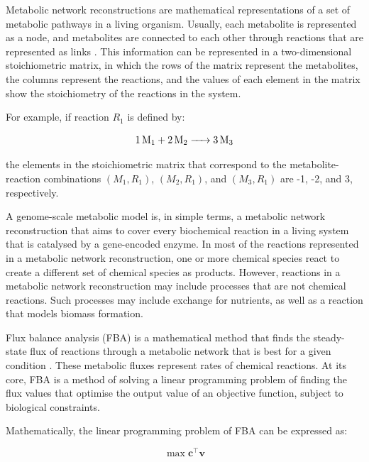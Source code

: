 Metabolic network reconstructions are mathematical representations of a set of metabolic pathways in a living organism.
Usually, each metabolite is represented as a node, and metabolites are connected to each other through reactions that are represented as links \parencite{palssonSystemsBiologyConstraintbased2015}.
This information can be represented in a two-dimensional stoichiometric matrix, in which the rows of the matrix represent the metabolites, the columns represent the reactions, and the values of each element in the matrix show the stoichiometry of the reactions in the system.

For example, if reaction $R_{1}$ is defined by:

\begin{equation}
  \ce{1 M1 + 2 M2 -> 3 M3}
  \label{eq:model-example-chemical-reaction}
\end{equation}

the elements in the stoichiometric matrix that correspond to the metabolite-reaction combinations $(M_{1}, R_{1})$, $(M_{2}, R_{1})$, and $(M_{3}, R_{1})$ are -1, -2, and 3, respectively.

A genome-scale metabolic model is, in simple terms, a metabolic network reconstruction that aims to cover every biochemical reaction in a living system that is catalysed by a gene-encoded enzyme.
In most of the reactions represented in a metabolic network reconstruction, one or more chemical species react to create a different set of chemical species as products.
However, reactions in a metabolic network reconstruction may include processes that are not chemical reactions.
Such processes may include exchange for nutrients, as well as a reaction that models biomass formation.

Flux balance analysis (FBA) is a mathematical method that finds the steady-state flux of reactions through a metabolic network that is best for a given condition \parencite{orthWhatFluxBalance2010}.
These metabolic fluxes represent rates of chemical reactions.
At its core, FBA is a method of solving a linear programming problem of finding the flux values that optimise the output value of an objective function, subject to biological constraints.

Mathematically, the linear programming problem of FBA can be expressed as:

\begin{equation}
  \max \mathbf{c}^{\intercal} \mathbf{v}
  \label{eq:model-fba-objective}
\end{equation}

